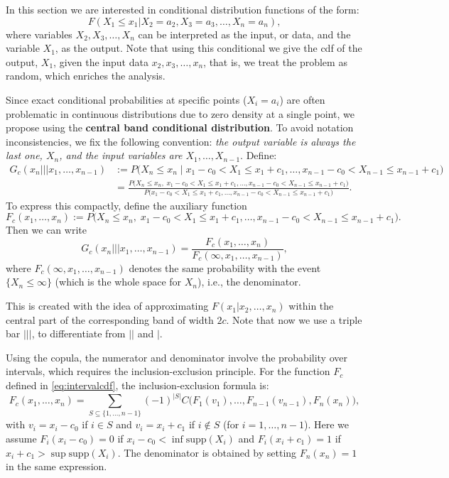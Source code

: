 In this section we are interested in conditional distribution functions of the form:
\begin{equation}
F(X_1 \leq x_1|X_2 = a_2, X_3 = a_3,\ldots, X_n = a_n),
\label{eq:pointconditional}
\end{equation}
where variables $X_2,X_3,\ldots,X_n$ can be interpreted as the input, or data, and the variable $X_1$, as the output. Note that using this conditional we give the cdf of the output, $X_1$, given the input data $x_2, x_3,\ldots, x_n$, that is, we treat the problem as random, which enriches the analysis.

Since exact conditional probabilities at specific points ($X_i = a_i$) are often problematic in continuous distributions due to zero density at a single point, we propose using the \textbf{central band conditional distribution}. To avoid notation inconsistencies, we fix the following convention: \emph{the output variable is always the last one, \(X_n\), and the input variables are \(X_1,\dots,X_{n-1}\)}. Define:
\begin{align}
G_c(x_n ||| x_1,\ldots, x_{n-1}) &:= P\bigl(X_n \leq x_n \;\big|\; x_1-c_0 < X_1 \leq x_1+c_1,\ldots, x_{n-1}-c_0 < X_{n-1} \leq x_{n-1}+c_1\bigr) \nonumber\\
&= \frac{P\bigl(X_n \leq x_n,\; x_1-c_0 < X_1 \leq x_1+c_1,\ldots, x_{n-1}-c_0 < X_{n-1} \leq x_{n-1}+c_1\bigr)}
        {P\bigl(x_1-c_0 < X_1 \leq x_1+c_1,\ldots, x_{n-1}-c_0 < X_{n-1} \leq x_{n-1}+c_1\bigr)}.
\label{eq:centralband}
\end{align}
To express this compactly, define the auxiliary function
\begin{equation}
F_c(x_1,\ldots, x_n) := P\bigl(X_n \leq x_n,\; x_1-c_0 < X_1 \leq x_1+c_1,\ldots, x_{n-1}-c_0 < X_{n-1} \leq x_{n-1}+c_1\bigr).
\label{eq:intervalcdf}
\end{equation}
Then we can write
\[
G_c(x_n ||| x_1,\ldots, x_{n-1}) = \frac{F_c(x_1,\ldots, x_n)}{F_c(\infty, x_1,\ldots, x_{n-1})},
\]
where \(F_c(\infty, x_1,\dots, x_{n-1})\) denotes the same probability with the event \(\{X_n \le \infty\}\) (which is the whole space for \(X_n\)), i.e., the denominator.

This is created with the idea of approximating \(F(x_1|x_2,\ldots, x_n)\) within the central part of the corresponding band of width \(2c\). Note that now we use a triple bar \(|||\), to differentiate from \(||\) and \(|\).

Using the copula, the numerator and denominator involve the probability over intervals, which requires the inclusion-exclusion principle. For the function \(F_c\) defined in \eqref{eq:intervalcdf}, the inclusion-exclusion formula is:
\[
F_c(x_1,\dots,x_n) = \sum_{S \subseteq \{1,\dots,n-1\}} (-1)^{|S|}
C\bigl( F_1(v_1), \dots, F_{n-1}(v_{n-1}), F_n(x_n) \bigr),
\]
with \(v_i = x_i - c_0\) if \(i \in S\) and \(v_i = x_i + c_1\) if \(i \notin S\) (for \(i=1,\dots,n-1\)). Here we assume \(F_i(x_i - c_0) = 0\) if \(x_i - c_0 < \inf \text{supp}(X_i)\) and \(F_i(x_i + c_1) = 1\) if \(x_i + c_1 > \sup \text{supp}(X_i)\). The denominator is obtained by setting \(F_n(x_n) = 1\) in the same expression.

